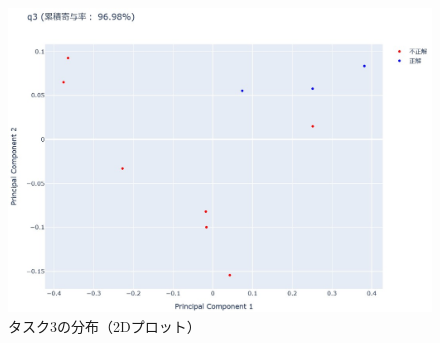 \documentclass[paper=a4paper,fontsize=11pt]{jlreq}
\begin{document}
      \begin{figure}[htbp]
        \centering
        \includegraphics[width=\linewidth]{2dplot_q3.jpg}
        \caption{タスク3の分布（2Dプロット）}
        \label{2dplot_q3}
      \end{figure}
      \FloatBarrier
      \pagebreak
\end{document}
